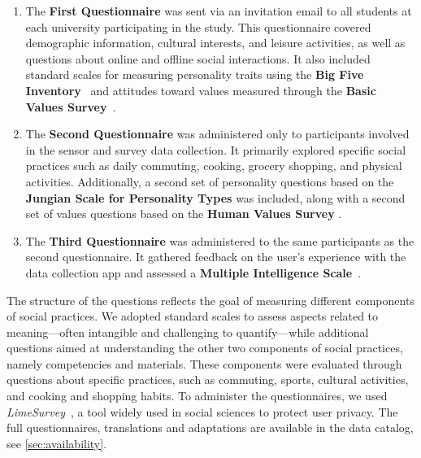 \begin{enumerate}
    \item The \textbf{First Questionnaire} was sent via an invitation email to all students at each university participating in the study. This questionnaire covered demographic information, cultural interests, and leisure activities, as well as questions about online and offline social interactions. It also included standard scales for measuring personality traits using the \textbf{Big Five Inventory}~\cite{donnellan2006mini} and attitudes toward values measured through the \textbf{Basic Values Survey}~\cite{gouveia2014functional}.
    \item The \textbf{Second Questionnaire} was administered only to participants involved in the sensor and survey data collection. It primarily explored specific social practices such as daily commuting, cooking, grocery shopping, and physical activities. Additionally, a second set of personality questions based on the \textbf{Jungian Scale for Personality Types} \cite{jung1971psychological,briggs1995gifts,mascarenas2016jungian,wilde2011jung} was included, along with a second set of values questions based on the \textbf{Human Values Survey} \cite{schwartz1994there,schwartz2001extending}.
    \item The \textbf{Third Questionnaire} was administered to the same participants as the second questionnaire. It gathered feedback on the user's experience with the data collection app and assessed a \textbf{Multiple Intelligence Scale}~\cite{tirri2008identification}.
\end{enumerate}
\noindent
The structure of the questions reflects the goal of measuring different components of social practices. We adopted standard scales to assess aspects related to meaning—often intangible and challenging to quantify—while additional questions aimed at understanding the other two components of social practices, namely competencies and materials. These components were evaluated through questions about specific practices, such as commuting, sports, cultural activities, and cooking and shopping habits.
To administer the questionnaires, we used \textit{LimeSurvey}~\cite{LS}, a tool widely used in social sciences to protect user privacy. The full questionnaires,  translations and adaptations are available in the data catalog, see \cref{sec:availability}.

